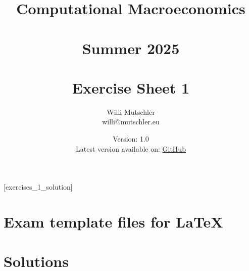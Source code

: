 
\newif\ifDisplaySolutions\DisplaySolutionstrue%


\title{Computational Macroeconomics\\~\\Summer 2025\\~\\Exercise Sheet 1}
\author{Willi Mutschler\\willi@mutschler.eu}
\date{Version: 1.0\\Latest version available on: \href{https://github.com/wmutschl/Computational-Macroeconomics/releases/latest/download/exercises_1.pdf}{GitHub}}
\maketitle\thispagestyle{empty}

\newpage
{}[exercises_1_solution]
\tableofcontents\thispagestyle{empty}\newpage

\setcounter{page}{1}
\newpage
\newpage
\newpage
\newpage
\newpage
\printbibliography%
\newpage
\appendix
\section{Exam template files for \LaTeX}





\ifDisplaySolutions%
\newpage
\section{Solutions}

\fi
